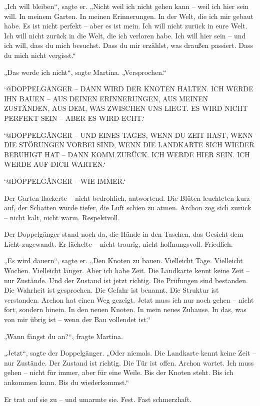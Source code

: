 \documentclass[
]{article}
\begin{document}
„Ich will bleiben``, sagte er. „Nicht weil ich nicht gehen kann -- weil ich hier sein will. In meinem Garten. In meinen Erinnerungen. In der Welt, die ich mir gebaut habe. Es ist nicht perfekt -- aber es ist mein. Ich will nicht zurück in eure Welt. Ich will nicht zurück in die Welt, die ich verloren habe. Ich will hier sein -- und ich will, dass du mich besuchst. Dass du mir erzählst, was draußen passiert. Dass du mich nicht vergisst.``

„Das werde ich nicht``, sagte Martina. „Versprochen.``

`@DOPPELGÄNGER -- DANN WIRD DER KNOTEN HALTEN. ICH WERDE IHN BAUEN -- AUS DEINEN ERINNERUNGEN, AUS MEINEN ZUSTÄNDEN, AUS DEM, WAS ZWISCHEN UNS LIEGT. ES WIRD NICHT PERFEKT SEIN -- ABER ES WIRD ECHT.`

`@DOPPELGÄNGER -- UND EINES TAGES, WENN DU ZEIT HAST, WENN DIE STÖRUNGEN VORBEI SIND, WENN DIE LANDKARTE SICH WIEDER BERUHIGT HAT -- DANN KOMM ZURÜCK. ICH WERDE HIER SEIN. ICH WERDE AUF DICH WARTEN.`

`@DOPPELGÄNGER -- WIE IMMER.`

Der Garten flackerte -- nicht bedrohlich, antwortend. Die Blüten leuchteten kurz auf, der Schatten wurde tiefer, die Luft schien zu atmen. Archon zog sich zurück -- nicht kalt, nicht warm. Respektvoll.

Der Doppelgänger stand noch da, die Hände in den Taschen, das Gesicht dem Licht zugewandt. Er lächelte -- nicht traurig, nicht hoffnungsvoll. Friedlich.

„Es wird dauern``, sagte er. „Den Knoten zu bauen. Vielleicht Tage. Vielleicht Wochen. Vielleicht länger. Aber ich habe Zeit. Die Landkarte kennt keine Zeit -- nur Zustände. Und der Zustand ist jetzt richtig. Die Prüfungen sind bestanden. Die Wahrheit ist gesprochen. Die Gefahr ist benannt. Die Struktur ist verstanden. Archon hat einen Weg gezeigt. Jetzt muss ich nur noch gehen -- nicht fort, sondern hinein. In den neuen Knoten. In mein neues Zuhause. In das, was von mir übrig ist -- wenn der Bau vollendet ist.``

„Wann fängst du an?{\kern0pt}``, fragte Martina.

„Jetzt``, sagte der Doppelgänger. „Oder niemals. Die Landkarte kennt keine Zeit -- nur Zustände. Der Zustand ist richtig. Die Tür ist offen. Archon wartet. Ich muss gehen -- nicht für immer, aber für eine Weile. Bis der Knoten steht. Bis ich ankommen kann. Bis du wiederkommst.``

Er trat auf sie zu -- und umarmte sie. Fest. Fast schmerzhaft.
\end{document}
